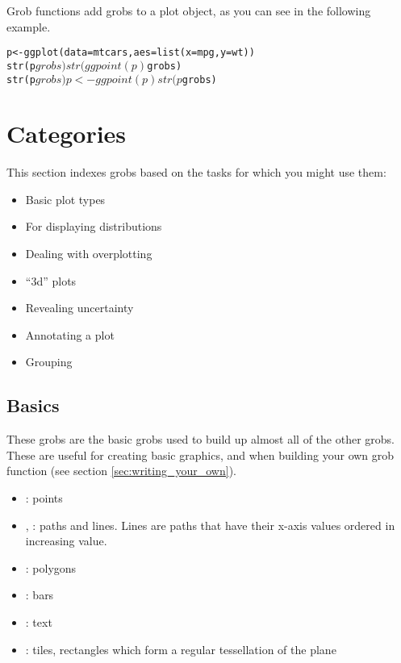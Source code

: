 Grob functions add grobs to a plot object, as you can see in the following example.

\begin{alltt}
p <- ggplot(data=mtcars, aes=list(x=mpg, y=wt))
str(p$grobs) 
str(ggpoint(p)$grobs)
str(p$grobs)
p <- ggpoint(p)
str(p$grobs)
\end{alltt}

\section{Categories}\label{sec:categories}

This section indexes grobs based on the tasks for which you might use them: 

\begin{itemize}
	\item Basic plot types
	\item For displaying distributions
	\item Dealing with overplotting
	\item ``3d'' plots
	\item Revealing uncertainty
	\item Annotating a plot
	\item Grouping
\end{itemize}


\subsection{Basics}\label{sub:basics}

These grobs are the basic grobs used to build up almost all of the other grobs.  These are useful for creating basic graphics, and when building your own grob function (see section \ref{sec:writing_your_own}).

\begin{itemize}
  \item {}: points
  \item {}, : paths and lines.  Lines are paths that have their x-axis values ordered in increasing value.
  \item {}: polygons
  \item {}: bars
  \item {}: text
  \item {}: tiles, rectangles which form a regular tessellation of the plane
\end{itemize}

